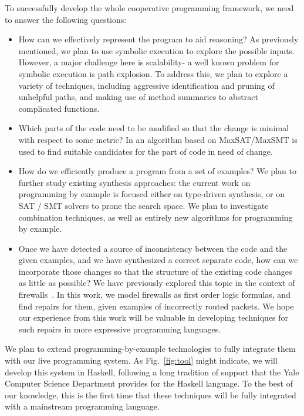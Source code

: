 To successfully develop the whole cooperative programming framework, 
we need to answer the following questions:
\begin{itemize}
\item How can we effectively represent the program to aid reasoning?  As previously mentioned, we plan to use symbolic execution to explore the possible inputs.  However, a major challenge here is scalability- a well known problem for symbolic execution is path explosion.  To address this, we plan to explore a variety of techniques, including aggressive identification and pruning of unhelpful paths, and making use of method summaries to abstract complicated functions.
\item Which parts of the code need to be modified so that the change is minimal with respect to some metric? In \cite{jose2011cause, pavlinovic2014finding} 
an algorithm based on MaxSAT/MaxSMT is used to find suitable candidates for the part of code in need of change.
\item How do we efficiently produce a program from a set of examples?
We plan to further study existing synthesis approaches: the current work on programming by example is focused either on type-driven synthesis, or on SAT / SMT solvers to prone the search space. We plan to investigate combination techniques, as well as entirely new algorithms for programming by example.
\item Once we have detected a source of inconsistency between the code and the given examples, and we have synthesized a correct separate code, how can we incorporate those changes so that the structure of the existing code changes as little as possible?
We have previously explored this topic in the context of firewalls~\cite{HallahanFMCAD17}.  In this work, we model firewalls as first order logic formulas, and find repairs for them, given examples of incorrectly routed packets.  We hope our experience from this work will be valuable in developing techniques for such repairs in more expressive programming languages.
\end{itemize}

We plan to extend programming-by-example technologies to fully integrate them with our live programming system. As Fig.~\ref{fig:tool} might indicate, we will develop this system in Haskell, following a long tradition of support that the Yale Computer Science Department provides for the Haskell language. To the best of our knowledge, this is the first time that these techniques will be fully integrated with a mainstream programming language.
%

